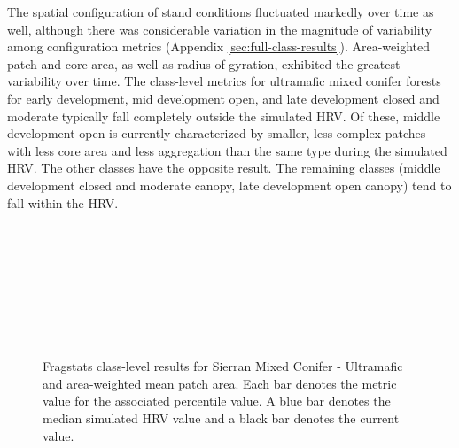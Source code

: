 The spatial configuration of stand conditions fluctuated markedly over time as well, although there was considerable variation in the magnitude of variability among configuration metrics (Appendix \ref{sec:full-class-results}). Area-weighted patch and core area, as well as radius of gyration, exhibited the greatest variability over time. The class-level metrics for ultramafic mixed conifer forests for early development, mid development open, and late development closed and moderate typically fall completely outside the simulated HRV. Of these, middle development open is currently characterized by smaller, less complex patches with less core area and less aggregation than the same type during the simulated HRV. The other classes have the opposite result. The remaining classes (middle development closed and moderate canopy, late development open canopy) tend to fall within the HRV.


\begin{figure}[!htbp]
  \\%
  \\%
    \\%
    \\%
    \\%
    \\%
    \\%
  \caption{Fragstats class-level results for Sierran Mixed Conifer - Ultramafic and area-weighted mean patch area. Each bar denotes the metric value for the associated percentile value. A blue bar denotes the median simulated HRV value and a black bar denotes the current value.}
  \label{fig:smcu_areaam}
\end{figure}

